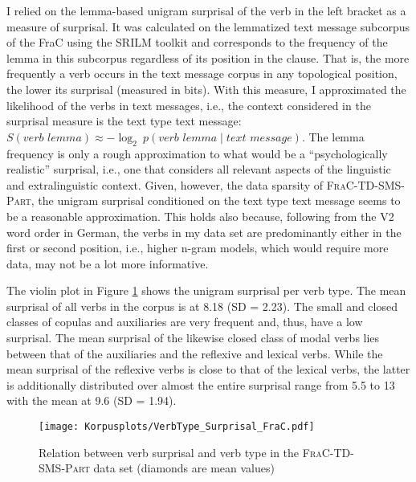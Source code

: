 \noindent
I relied on the lemma-based unigram surprisal of the verb in the left bracket as a measure of surprisal.
It was calculated on the lemmatized text message subcorpus of the FraC using the SRILM toolkit \citep{stolcke2002} and corresponds to the frequency of the lemma in this subcorpus regardless of its position in the clause.
That is, the more frequently a verb occurs in the text message corpus in any topological position, the lower its surprisal (measured in bits).
With this measure, I approximated the likelihood of the verbs in text messages, i.e., the context considered in the surprisal measure is the text type  text message:
$S(\textit{verb lemma}) \approx \mathbin{-}\log_{2}\ p(\textit{verb lemma}\mathbin{|}\textit{text message})$.
The lemma frequency is only a rough approximation to what would be a ``psychologically realistic'' surprisal, i.e., one that considers all relevant aspects of the linguistic and extralinguistic context.
Given, however, the data sparsity of \textsc{FraC-TD-SMS-Part}, the unigram surprisal conditioned on the text type  text message seems to be a reasonable approximation.
This holds also because, following from the V2 word order  in German, the verbs in my data set are predominantly either in the first or second position, i.e., higher n-gram models, which would require more data, may not be a lot more informative.

    
The violin plot in Figure \ref{fig:frac.surprisal.verb.type} shows the unigram surprisal per verb type.
The mean surprisal of all verbs in the corpus is at 8.18 (SD = 2.23).
The small and closed classes of copulas and auxiliaries are very frequent and, thus, have a low surprisal.
The mean surprisal of the likewise closed class of modal verbs lies between that of the auxiliaries and the reflexive and lexical verbs.
While the mean surprisal of the reflexive verbs is close to that of the lexical verbs, the latter is additionally distributed over almost the entire surprisal range from 5.5 to 13 with the mean at 9.6 (SD = 1.94).

\begin{figure}
\centering
\texttt{[image: Korpusplots/VerbType\_Surprisal\_FraC.pdf]}
\caption[Relation between verb surprisal and verb type in \textsc{FraC-TD-SMS-Part}]{Relation between verb surprisal and verb type in the \textsc{FraC-TD-SMS-Part} data set (diamonds are mean values)}
\label{fig:frac.surprisal.verb.type}
\end{figure}

